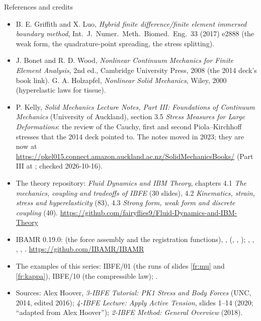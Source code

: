 \documentclass[aspectratio=169,11pt]{beamer}
\begin{document}
\begin{frame}{References and credits}
\label{fr:refs}
\scriptsize
\begin{itemize}
  \item B. E. Griffith and X. Luo, \emph{Hybrid finite difference/finite element immersed boundary method}, Int.\ J.\ Numer.\ Meth.\ Biomed.\ Eng.\ 33 (2017) e2888 (the weak form, the quadrature-point spreading, the stress splitting).
  \item J. Bonet and R. D. Wood, \emph{Nonlinear Continuum Mechanics for Finite Element Analysis}, 2nd ed., Cambridge University Press, 2008 (the 2014 deck's book link). G. A. Holzapfel, \emph{Nonlinear Solid Mechanics}, Wiley, 2000 (hyperelastic laws for tissue).
  \item P. Kelly, \emph{Solid Mechanics Lecture Notes, Part III: Foundations of Continuum Mechanics} (University of Auckland), section 3.5 \emph{Stress Measures for Large Deformations}: the review of the Cauchy, first and second Piola--Kirchhoff stresses that the 2014 deck pointed to. The notes moved in 2023; they are now at \url{https://pkel015.connect.amazon.auckland.ac.nz/SolidMechanicsBooks/} (Part III at ; checked 2026-10-16).
  \item The theory repository: \emph{Fluid Dynamics and IBM Theory}, chapters 4.1 \emph{The mechanics, coupling and tradeoffs of IBFE} (30 slides), 4.2 \emph{Kinematics, strain, stress and hyperelasticity} (83), 4.3 \emph{Strong form, weak form and discrete coupling} (40). \url{https://github.com/fairyflies9/Fluid-Dynamics-and-IBM-Theory}
  \item IBAMR 0.19.0:  (the force assembly and the registration functions), ,  (, , ); , , , , . \url{https://github.com/IBAMR/IBAMR}
  \item The examples of this series: IBFE/01 (the runs of slides \ref{fr:mu} and \ref{fr:kappa}), IBFE/10 (the compressible law); .
  \item Sources: Alex Hoover, \emph{3-IBFE Tutorial: PK1 Stress and Body Forces} (UNC, 2014, edited 2016); \emph{4-IBFE Lecture: Apply Active Tension}, slides 1--14 (2020; ``adapted from Alex Hoover''); \emph{2-IBFE Method: General Overview} (2018).
\end{itemize}
\end{frame}
\end{document}
